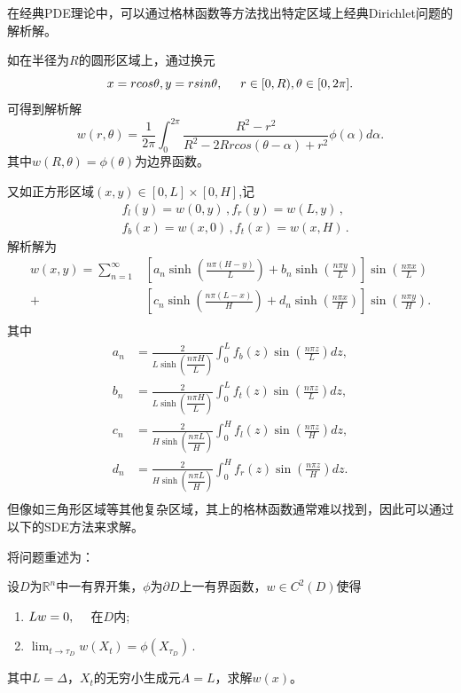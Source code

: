 \documentclass[oneside]{sysuthesis}
\begin{document}
在经典PDE理论中，可以通过格林函数\cite{evans2010pde}等方法找出特定区域上经典Dirichlet问题的解析解。

如在半径为$R$的圆形区域上，通过换元
\[
x=rcos\theta,y=rsin\theta,\hspace{0.5cm}r\in[0,R),\theta\in[0,2\pi].
\]
可得到解析解
\begin{equation}
	w(r,\theta)=\frac{1}{2\pi}\int_{0}^{2\pi}\frac{R^2-r^2}{R^2-2Rrcos(\theta-\alpha)+r^2}\phi(\alpha)d\alpha.
\end{equation}
其中$w(R,\theta)=\phi(\theta)$为边界函数。

又如正方形区域$(x,y)\in[0,L]\times[0,H]$,记
\begin{equation*}
	\begin{split}
		&f_l(y)=w(0,y)\,,f_r(y)=w(L,y)\,,\\
		&f_b(x)=w(x,0)\,,f_t(x)=w(x,H)\,.
	\end{split}
\end{equation*}
解析解为
\begin{equation}
	\begin{split}
		w(x,y) = \sum_{n=1}^{\infty}&\left[a_n \sinh(\frac{n\pi(H-y)}{L})+b_n\sinh(\frac{n\pi y}{L})\right]\sin(\frac{n\pi x}{L})\\
		+&\left[c_n \sinh(\frac{n\pi(L-x)}{H})+d_n\sinh(\frac{n\pi x}{H})\right]\sin(\frac{n\pi y}{H}).\\
	\end{split}
\end{equation}
其中
\begin{equation}
	\begin{split}
		a_n&=\frac{2}{L\sinh(\dfrac{n\pi H}{L})}\int_{0}^{L}f_b(z)\sin(\frac{n\pi z}{L})dz,\\
		b_n&=\frac{2}{L\sinh(\dfrac{n\pi H}{L})}\int_{0}^{L}f_t(z)\sin(\frac{n\pi z}{L})dz,\\
		c_n&=\frac{2}{H\sinh(\dfrac{n\pi L}{H})}\int_{0}^{H}f_l(z)\sin(\frac{n\pi z}{H})dz,\\
		d_n&=\frac{2}{H\sinh(\dfrac{n\pi L}{H})}\int_{0}^{H}f_r(z)\sin(\frac{n\pi z}{H})dz.\\
	\end{split}
\end{equation}
但像如三角形区域等其他复杂区域，其上的格林函数通常难以找到，因此可以通过以下的SDE方法来求解。

将问题重述为：

设$D$为$\mathbb{R}^n$中一有界开集，$\phi$为$\partial D$上一有界函数，$w\in C^2(D)$使得
\begin{enumerate}[label=(\arabic*)]
	\item $Lw=0,\hspace{0.5cm}$在$D$内;
	\item $\lim_{t\to\tau_D}w(X_t)=\phi(X_{\tau_D})$\,.
\end{enumerate}
其中$L=\Delta$，$X_t$的无穷小生成元$A=L$，求解$w(x)$。
\end{document}
